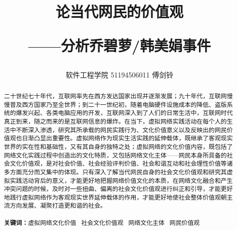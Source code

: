 \documentclass[UTF8]{ctexart}
\begin{document}
	\title{\textbf{论当代网民的价值观}\\[1ex]\begin{large}
			——分析乔碧萝/韩美娟事件
		\end{large}}
	\author{软件工程学院 51194506011 傅剑铃}
	\maketitle
\begin{abstract}
	二十世纪七十年代，互联网率先在西方发达国家出现并逐渐发展；九十年代，互联网慢慢普及西方国家乃至全世界；到二十一世纪初，随着电脑硬件设施成本的降低、盗版系统的爆发兴起、各类电脑应用的开发，互联网深入到了人们的日常生活中，互联网时代真正到来，随之而来的是互联网信息的爆炸。在当下，虚拟网络实践活动在每个人的生活中不断深入渗透，研究其所承载的网民实践行为、文化价值意义以及反映出的网民价值观也日渐凸显出重要性。虚拟网络作为现实生活实践的延伸载体，既继承了客观现实世界的实在性和基础性，又有其自身的独特之处；虚拟网络的文化价值内容，既包括了网络文化实践过程中创造出的文化特质，又包括网络文化主体——网民本身所具备的社会文化价值观，是对社会价值、社会经验评判价值、社会和谐互动和社会理性价值等诸多方面充分而又集中的体现。只有深入了解当代网民自身的社会文化价值观和研究其虚拟实践活动背后的意义，才能更好地把握网络价值文化的本质，在网络文化融合和产生冲突问题的时候，及时对一些扭曲、偏离的社会文化价值观进行纠正和引导，才能更好地践行虚拟网络作为客观现实世界延伸载体的作用，才能更好地使社会整体价值观朝主流方向发展、凝聚打造更和谐的社会。\\
	\\
	\textbf{关键词：}虚拟网络文化价值 \, 社会文化价值观 \,  网络文化主体 \, 网民价值观
\end{abstract}
	
\end{document}
